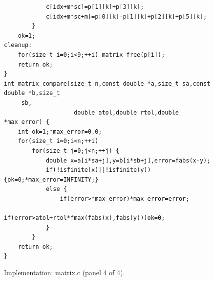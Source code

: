 \documentclass[11pt,a4paper]{article}
\begin{document}
\begin{figure}[!htbp]\begin{minipage}{\linewidth}\fontsize{10}{11.4}\selectfont\begin{verbatim}
            c[idx+m*sc]=p[1][k]+p[3][k];
            c[idx+m*sc+m]=p[0][k]-p[1][k]+p[2][k]+p[5][k];
        }
    ok=1;
cleanup:
    for(size_t i=0;i<9;++i) matrix_free(p[i]);
    return ok;
}
int matrix_compare(size_t n,const double *a,size_t sa,const double *b,size_t
     sb,
                    double atol,double rtol,double *max_error) {
    int ok=1;*max_error=0.0;
    for(size_t i=0;i<n;++i)
        for(size_t j=0;j<n;++j) {
            double x=a[i*sa+j],y=b[i*sb+j],error=fabs(x-y);
            if(!isfinite(x)||!isfinite(y)) {ok=0;*max_error=INFINITY;}
            else {
                if(error>*max_error)*max_error=error;
                if(error>atol+rtol*fmax(fabs(x),fabs(y)))ok=0;
            }
        }
    return ok;
}
\end{verbatim}\end{minipage}\caption{Implementation: matrix.c (panel 4 of 4).}\end{figure}
\clearpage
\end{document}
